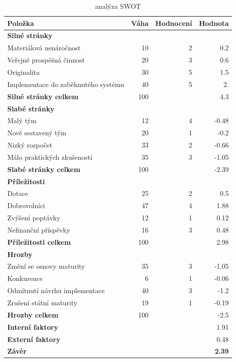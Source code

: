 \documentclass[12pt, a4paper]{report}
\begin{document}
\label{sec:org2eb4c79}
\begin{table}[htbp]
\caption{analýza SWOT}
\centering
\begin{tabularx}{\textwidth}{Xrrr}
Položka & Váha & Hodnocení & Hodnota\\
\hline
\textbf{Silné stránky} &  &  & \\
Materiálová nenáročnost & 10 & 2 & 0.2\\
Veřejně prospěšná činnost & 20 & 3 & 0.6\\
Originalita & 30 & 5 & 1.5\\
Implementace do zaběhnutého systému & 40 & 5 & 2.\\
\hline
\textbf{Silné stránky celkem} & 100 &  & 4.3\\
\hline
\textbf{Slabé stránky} &  &  & \\
Malý tým & 12 & 4 & -0.48\\
Nově sestavený tým & 20 & 1 & -0.2\\
Nizký rozpočet & 33 & 2 & -0.66\\
Málo praktických zkušeností & 35 & 3 & -1.05\\
\hline
\textbf{Slabé stránky celkem} & 100 &  & -2.39\\
\hline
\textbf{Příležitosti} &  &  & \\
Dotace & 25 & 2 & 0.5\\
Dobrovolníci & 47 & 4 & 1.88\\
Zvýšení poptávky & 12 & 1 & 0.12\\
Nefinanční příspěvky & 16 & 3 & 0.48\\
\hline
\textbf{Příležitosti celkem} & 100 &  & 2.98\\
\hline
\textbf{Hrozby} &  &  & \\
Změní se osnovy maturity & 35 & 3 & -1.05\\
Konkurence & 6 & 1 & -0.06\\
Odmítnutí návrhu implementace & 40 & 3 & -1.2\\
Zrušení státní maturity & 19 & 1 & -0.19\\
\hline
\textbf{Hrozby celkem} & 100 &  & -2.5\\
\hline
\textbf{Interní faktory} &  &  & 1.91\\
\textbf{Externí faktory} &  &  & 0.48\\
\hline
\textbf{Závěr} &  &  & \textbf{2.39}\\
\end{tabularx}
\end{table}
\end{document}
